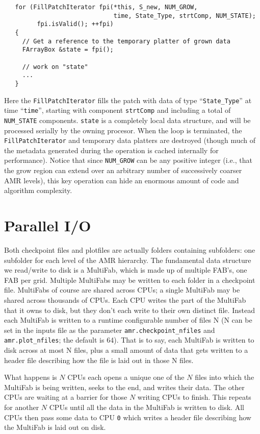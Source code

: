 \begin{lstlisting}
   for (FillPatchIterator fpi(*this, S_new, NUM_GROW,
                              time, State_Type, strtComp, NUM_STATE);
         fpi.isValid(); ++fpi)
   {
     // Get a reference to the temporary platter of grown data
     FArrayBox &state = fpi();

     // work on "state"
     ...
   }           
\end{lstlisting}
Here the {\tt FillPatchIterator} fills the patch 
with data of type ``{\tt State\_Type}'' at time ``{\tt time}'',
starting with component {\tt strtComp} and including a total of
{\tt NUM\_STATE} components.  {\tt state} is a completely local
data structure, and will be processed serially by the owning 
procesor.  When the loop is terminated, the {\tt FillPatchIterator} 
and temporary data platters are destroyed (though much of the 
metadata generated during the operation is cached internally
for performance).  Notice that since {\tt NUM\_GROW} can be any
positive integer (i.e., that the grow region can extend over an arbitrary 
number of successively coarser AMR levels), this key operation can hide an
enormous amount of code and algorithm complexity.

\section{Parallel I/O}

Both checkpoint files and plotfiles are actually folders containing
subfolders: one subfolder for each level of the AMR hierarchy.
The fundamental data structure we read/write to disk is a MultiFab,
which is made up of multiple FAB's, one FAB per grid.  Multiple
MultiFabs may be written to each folder in a checkpoint file.
MultiFabs of course are shared across CPUs; a single MultiFab may be
shared across thousands of CPUs.  Each CPU writes the part of the
MultiFab that it owns to disk, but they don't each write to their own
distinct file.  Instead each MultiFab is written to a runtime
configurable number of files N (N can be set in the inputs file as the
parameter {\tt amr.checkpoint\_nfiles} and {\tt amr.plot\_nfiles}; the
default is 64).  That is to say, each MultiFab is written to disk
across at most N files, plus a small amount of data that gets written
to a header file describing how the file is laid out in those N files.

What happens is $N$ CPUs each opens a unique one of the $N$ files into
which the MultiFab is being written, seeks to the end, and writes
their data.  The other CPUs are waiting at a barrier for those $N$
writing CPUs to finish.  This repeats for another $N$ CPUs until all the
data in the MultiFab is written to disk.  All CPUs then pass some data
to CPU {\tt 0} which writes a header file describing how the MultiFab is
laid out on disk.

